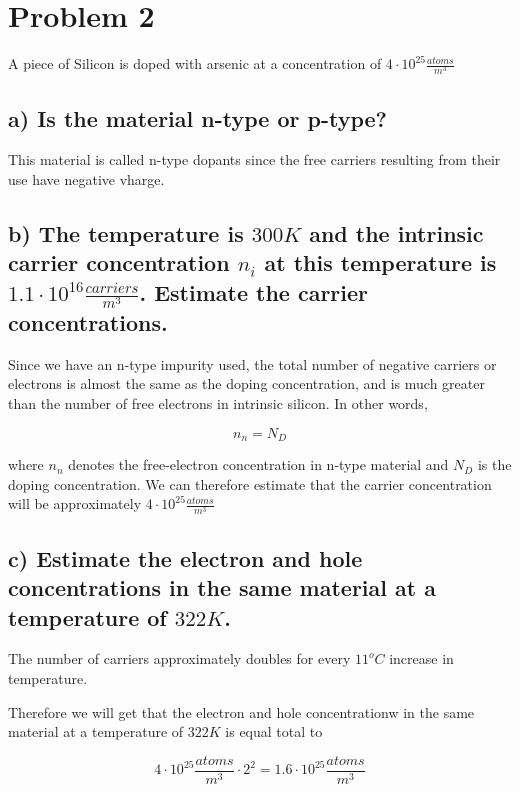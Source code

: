 \section{Problem 2}
A piece of Silicon is doped with arsenic at a concentration of $4 \cdot 10^25 \frac{atoms}{m^3}$

\subsection*{a) Is the material n-type or p-type?}

This material is called n-type dopants since the free carriers resulting from their use have negative vharge.

\subsection*{b) The temperature is $300 K$ and the intrinsic carrier concentration $n_i$ at this temperature is $1.1 \cdot 10^16 \frac{carriers}{m^3}$. Estimate the carrier concentrations.}

Since we have an n-type impurity used, the total number of negative carriers or electrons is almost the same as the doping concentration, and is much greater than the number of free electrons in intrinsic silicon. In other words,

\begin{equation*}
    n_n = N_D
\end{equation*}

where $n_n$ denotes the free-electron concentration in n-type material and $N_D$ is the doping concentration. We can therefore estimate that the carrier concentration will be approximately $4 \cdot 10^{25} \frac{atoms}{m^3}$

\subsection*{c) Estimate the electron and hole concentrations in the same material at a temperature
of $322 K$.}

The number of carriers approximately doubles for every $11 ^o C$ increase in temperature.

Therefore we will get that the electron and hole concentrationw in the same material at a temperature of $322 K$ is equal total to 

\begin{equation*}
    4 \cdot 10^{25} \frac{atoms}{m^3} \cdot 2^2 = 1.6 \cdot 10^ {25}\frac{atoms}{m^3}
\end{equation*}

